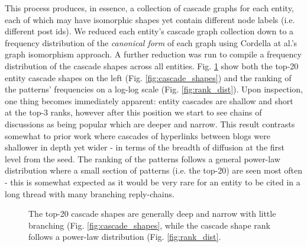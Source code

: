 \documentclass[journal,10pt,draftclsnofoot,onecolumn]{IEEEtran}
\begin{document}
This process produces, in essence, a collection of cascade graphs for each entity, each of which may have isomorphic shapes yet contain different node labels (i.e. different post ids).
We reduced each entity's cascade graph collection down to a frequency distribution of the \emph{canonical form} of each graph using Cordella at al.'s \cite{cordella2001improved} graph isomorphism approach.
A further reduction was run to compile a frequency distribution of the cascade shapes across all entities.
Fig. \ref{fig:entity_cascades} show both the top-20 entity cascade shapes on the left (Fig. \ref{fig:cascade_shapes}) and the ranking of the patterns' frequencies on a log-log scale (Fig. \ref{fig:rank_dist}).
Upon inspection, one thing becomes immediately apparent: entity cascades are shallow and short at the top-3 ranks, however after this position we start to see chains of discussions as being popular which are deeper and narrow.
This result contrasts somewhat to prior work \cite{leskovec2007patterns} where cascades of hyperlinks between blogs were shallower in depth yet wider - in terms of the breadth of diffusion at the first level from the seed. 
The ranking of the patterns follows a general power-law distribution where a small section of patterns (i.e. the top-20) are seen most often - this is somewhat expected as it would be very rare for an entity to be cited in a long thread with many branching reply-chains.

\begin{figure}[ht!]
  \begin{center}
  \end{center}    
  \caption{The top-20 cascade shapes are generally deep and narrow with little branching (Fig. \ref{fig:cascade_shapes}, while the cascade shape rank follows a power-law distribution (Fig. \ref{fig:rank_dist}.}
  \label{fig:entity_cascades}
\end{figure}
\end{document}
